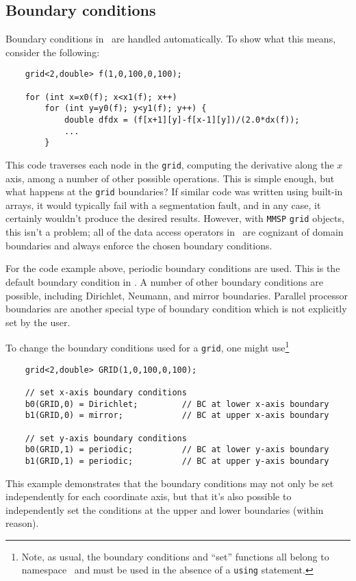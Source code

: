\subsection{Boundary conditions}
Boundary conditions in \MMSP\ are handled automatically.  To show what this means, consider the following:
\begin{shadebox}
\begin{verbatim}
    grid<2,double> f(1,0,100,0,100);

    for (int x=x0(f); x<x1(f); x++)
        for (int y=y0(f); y<y1(f); y++) {
            double dfdx = (f[x+1][y]-f[x-1][y])/(2.0*dx(f));
            ...
        }
\end{verbatim}
\end{shadebox}
This code traverses each node in the {\tt grid}, computing the derivative along the $x$ axis, among a number of other possible operations.  This is simple enough, but what happens at the {\tt grid} boundaries?  If similar code was written using built-in arrays, it would typically fail with a segmentation fault, and in any case, it certainly wouldn't produce the desired results.  However, with {\tt MMSP} {\tt grid} objects, this isn't a problem; all of the data access operators in \MMSP\ are cognizant of domain boundaries and always enforce the chosen boundary conditions.

For the code example above, periodic boundary conditions are used.  This is the default boundary condition in \MMSP.  A number of other boundary conditions are possible, including Dirichlet, Neumann, and mirror boundaries.  Parallel processor boundaries are another special type of boundary condition which is not explicitly set by the user.

To change the boundary conditions used for a {\tt grid}, one might use\footnote{Note, as usual, the boundary conditions and ``set'' functions all belong to namespace \MMSP\ and must be used in the absence of a {\tt using} statement.}
\begin{shadebox}
\begin{verbatim}
    grid<2,double> GRID(1,0,100,0,100);

    // set x-axis boundary conditions
    b0(GRID,0) = Dirichlet;         // BC at lower x-axis boundary
    b1(GRID,0) = mirror;            // BC at upper x-axis boundary

    // set y-axis boundary conditions
    b0(GRID,1) = periodic;          // BC at lower y-axis boundary
    b1(GRID,1) = periodic;          // BC at upper y-axis boundary
\end{verbatim}
\end{shadebox}
This example demonstrates that the boundary conditions may not only be set independently for each coordinate axis, but that it's also possible to independently set the conditions at the upper and lower boundaries (within reason).


